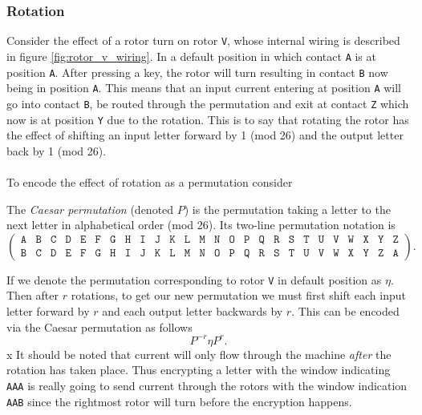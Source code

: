 \subsubsection{Rotation}

Consider the effect of a rotor turn on rotor \texttt{V}, whose
internal wiring is described in figure \ref{fig:rotor_v_wiring}.
In a default position in which contact \texttt{A} is at position
\texttt{A}. After pressing a key, the rotor
will turn resulting in contact \texttt{B} now being in position
\texttt{A}. This means that an input current
entering at position \texttt{A} will go into contact \texttt{B}, be
routed through the permutation and exit at contact
\texttt{Z} which now is at position \texttt{Y} due to the rotation.
This is to say that rotating the rotor has the effect
of shifting an input letter forward by 1 (mod 26) and the output
letter back by 1 (mod 26).
\\\\To encode the effect of rotation as a permutation consider
\begin{definition}
  The \emph{Caesar permutation} (denoted $P$) is the permutation
  taking a letter to the next letter in alphabetical order (mod 26).
  Its two-line permutation notation is
  \[
    \left(
      \begin{array}{llllllllllllllllllllllllll}
        \texttt{A} & \texttt{B} & \texttt{C} & \texttt{D} &
        \texttt{E} & \texttt{F} & \texttt{G} & \texttt{H} &
        \texttt{I} & \texttt{J} & \texttt{K} & \texttt{L} &
        \texttt{M} & \texttt{N} & \texttt{O} & \texttt{P} &
        \texttt{Q} & \texttt{R} & \texttt{S} & \texttt{T} &
        \texttt{U} & \texttt{V} & \texttt{W} & \texttt{X} &
        \texttt{Y} & \texttt{Z}                             \\
        \texttt{B} & \texttt{C} & \texttt{D} &
        \texttt{E} & \texttt{F} & \texttt{G} & \texttt{H} &
        \texttt{I} & \texttt{J} & \texttt{K} & \texttt{L} &
        \texttt{M} & \texttt{N} & \texttt{O} & \texttt{P} &
        \texttt{Q} & \texttt{R} & \texttt{S} & \texttt{T} &
        \texttt{U} & \texttt{V} & \texttt{W} & \texttt{X} &
        \texttt{Y} & \texttt{Z} & \texttt{A}
      \end{array}
    \right).
  \]
\end{definition}
\noindent If we denote the permutation corresponding to rotor \texttt{V} in
default position as $\eta$. Then after $r$ rotations, to get
our new permutation we must first shift each input letter forward by
$r$ and each output letter backwards by $r$. This can be encoded via
the Caesar permutation as follows
\[
  {P^{-r}}\eta{P^{r}}.
\]x
\noindent It should be noted that current will only flow through the
machine \emph{after} the rotation has taken place. Thus encrypting a
letter with the window indicating \texttt{AAA} is really going to
send current through the rotors with the window indication
\texttt{AAB} since the rightmost rotor will turn before the encryption happens.
